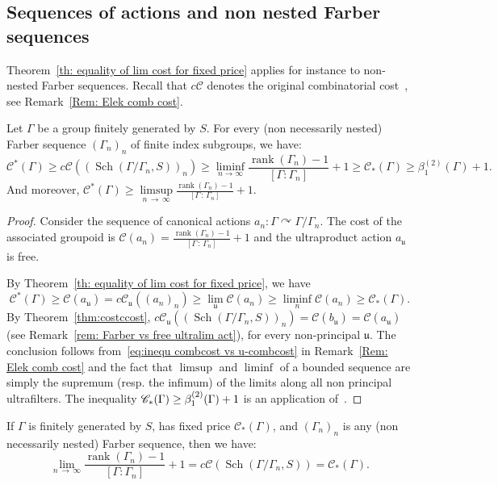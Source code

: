 \documentclass[AHL,Unicode,longabstracts,published]{cedram}
\newcommand{\acting}{\curvearrowright}
\newcommand{\cost}{\mathcal{C}}
\newcommand{\ccost}{c\mathcal{C}}
\newcommand{\vraicost}{\mathscr{C}}
\DeclareMathOperator{\rank}{rank}
\DeclareMathOperator{\Sch}{Sch}
\newcommand{\ul}{\mathfrak{u}}
\begin{document}
\subsection{Sequences of actions and non nested Farber sequences}


Theorem~\ref{th: equality of lim cost for fixed price} applies for instance to non-nested Farber sequences. Recall that $\ccost$ denotes the original combinatorial cost~\cite{Elek-combinatorial-cost-2007}, see Remark~\ref{Rem: Elek comb cost}.
\begin{theo}\label{cor: rk grad vs cost - non fixed price}
Let $\Gamma$ be a group finitely generated by $S$. For every (non necessarily nested) Farber sequence $(\Gamma_n)_n$ of finite index subgroups, we have:
\[
\vraicost^*(\Gamma)\geq \ccost\left(\left(\Sch\left(\Gamma/\Gamma_n, S\right)\right)_n\right) \geq \liminf\limits_{n\to \infty}\frac{\rank(\Gamma_n)-1}{[\Gamma:\Gamma_n]} +1\geq \vraicost_*(\Gamma)\geq \beta^{(2)}_1(\Gamma)+1.
\]
And moreover, $
\vraicost^*(\Gamma)\geq \limsup\limits_{n\,\to\,\infty} \tfrac{\rank(\Gamma_n)-1}{[\Gamma\,:\,\Gamma_n]}+1. $
\end{theo}

\begin{proof}
Consider the sequence of canonical actions $a_n:\Gamma\acting \Gamma/\Gamma_n$. The cost of the associated groupoid is $\cost(a_n)=\tfrac{\rank(\Gamma_n)-1}{[\Gamma\,:\,\Gamma_n]}+1$ and the ultraproduct action $a_\ul$ is free.


By Theorem~\ref{th: equality of lim cost for fixed price}, we have
\[
\vraicost^*(\Gamma)\geq \cost(a_\ul)=\ccost_\ul((a_n)_n) \geq \lim_{\ul}\cost(a_{n})\geq \liminf_{n}\cost(a_{n}) \geq \vraicost_*(\Gamma).
\]
By Theorem~\ref{thm:costccost}, $\ccost_\ul((\Sch(\Gamma/\Gamma_n, S))_n)=\cost(b_\ul)=\cost(a_\ul)$ (see Remark~\ref{rem: Farber vs free ultralim act}), for every non-principal $\ul$. The conclusion follows from~\eqref{eq:inequ combcost vs u-combcost} in Remark~\ref{Rem: Elek comb cost} and the fact that $\limsup$ and $\liminf$ of a bounded sequence are simply the supremum (resp. the infimum) of the limits along all non principal ultrafilters. The inequality $\vraicost_*(\Gamma)\linebreak\geq \beta^{(2)}_1(\Gamma)+1$ is an application of~\cite[Corollaire~3.23]{gab_ihes}.
\end{proof}

\begin{coro}\label{cor: rk grad vs cost fixed price}
If $\Gamma$ is finitely generated by $S$, has fixed price $\vraicost_*(\Gamma)$, and $(\Gamma_n)_n$ is any (non necessarily nested) Farber sequence, then we have:
\[
\lim\limits_{n\,\to\,\infty} \frac{\rank(\Gamma_n)-1}{[\Gamma:\Gamma_n]}+1=\ccost\left(\Sch\left(\Gamma/\Gamma_n, S\right)\right)=\vraicost_*(\Gamma).
\]
\end{coro}
\end{document}
